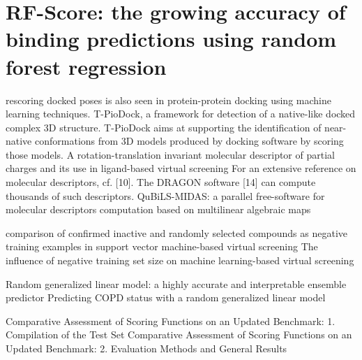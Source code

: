 \chapter{RF-Score: the growing accuracy of binding predictions using random forest regression}

\citep{1399} rescoring docked poses is also seen in protein-protein docking using machine learning techniques. T-PioDock, a framework for detection of a native-like docked complex 3D structure. T-PioDock aims at supporting the identification of near-native conformations from 3D models produced by docking software by scoring those models.
\citep{1389} A rotation-translation invariant molecular descriptor of partial charges and its use in ligand-based virtual screening
\citep{1389} For an extensive reference on molecular descriptors, cf. [10]. The DRAGON software [14] can compute thousands of such descriptors.
\citep{1400} QuBiLS-MIDAS: a parallel free-software for molecular descriptors computation based on multilinear algebraic maps

\citep{1423} comparison of confirmed inactive and randomly selected compounds as negative training examples in support vector machine-based virtual screening
\citep{1404} The influence of negative training set size on machine learning-based virtual screening

\citep{1377} Random generalized linear model: a highly accurate and interpretable ensemble predictor
\citep{1418} Predicting COPD status with a random generalized linear model

\citep{1426} Comparative Assessment of Scoring Functions on an Updated Benchmark: 1. Compilation of the Test Set
\citep{1411} Comparative Assessment of Scoring Functions on an Updated Benchmark: 2. Evaluation Methods and General Results

\chapterend
